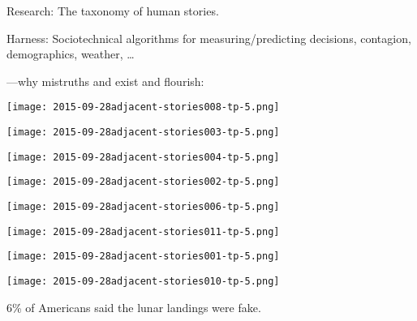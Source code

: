         Research: The taxonomy of human stories.
       
        Harness: Sociotechnical algorithms for measuring/predicting decisions, contagion, demographics, weather, \ldots
  
  
   
    ---why mistruths and 
     exist and flourish:
  
  
\begin{marginfigure}
  \texttt{[image: 2015-09-28adjacent-stories008-tp-5.png]}
\end{marginfigure}

  \qquad\qquad
  
\begin{marginfigure}
  \texttt{[image: 2015-09-28adjacent-stories003-tp-5.png]}
\end{marginfigure}

  
\begin{marginfigure}
  \texttt{[image: 2015-09-28adjacent-stories004-tp-5.png]}
\end{marginfigure}

  \qquad\qquad
  
\begin{marginfigure}
  \texttt{[image: 2015-09-28adjacent-stories002-tp-5.png]}
\end{marginfigure}

  
\begin{marginfigure}
  \texttt{[image: 2015-09-28adjacent-stories006-tp-5.png]}
\end{marginfigure}

  \qquad\qquad
  
\begin{marginfigure}
  \texttt{[image: 2015-09-28adjacent-stories011-tp-5.png]}
\end{marginfigure}

  
\begin{marginfigure}
  \texttt{[image: 2015-09-28adjacent-stories001-tp-5.png]}
\end{marginfigure}

  \qquad\qquad
  
\begin{marginfigure}
  \texttt{[image: 2015-09-28adjacent-stories010-tp-5.png]}
\end{marginfigure}
  \textbf{
    }
      6\% of Americans said the lunar landings were fake.
     
